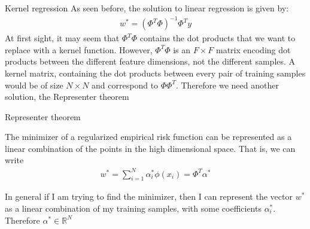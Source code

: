\begin{parag}{Kernel regression}
    As seen before, the solution to linear regression is given by:
	\begin{align*} 
		w^{\ast} =  \left(\Phi^{T}\Phi\right)^{-1} \Phi^{T}y
	\end{align*}
	At first sight, it may seem that $\Phi^{T}\Phi$ contains the dot products that we want to replace with a kernel function. However, $\Phi^{T}\Phi$ is an $F \times F$ matrix encoding dot products between the different feature dimensions, not the different samples. A kernel matrix, containing the dot products between every pair of training samples would be of size $N \times N$ and correspond to $\Phi\Phi^{T}$. Therefore we need another solution, the Representer theorem
\end{parag}


\begin{parag}{Representer theorem}
	\begin{theoreme}
	The minimizer of a regularized empirical risk function can be represented as a linear combination of the points in the high dimensional space. That is, we can write 
		\begin{align*} 
			w^{\ast} =  \sum_{i= 1}^{N}\alpha_i^{\ast}\phi\left(x_i\right) =  \Phi^{T}\alpha^{\ast}
		\end{align*}
	\end{theoreme}
	In general if I am trying to find the minimizer, then I can represent the vector $w^{\ast}$ as a linear combination of my training samples, with some coefficients $\alpha_i^{\ast}$. Therefore $\alpha^{\ast} \in \mathbb{R}^{N}$
\end{parag}

